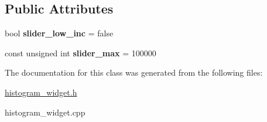 \subsection*{Public Attributes}
\begin{DoxyCompactItemize}
\item 
\hypertarget{classhistogram__widget_afc734f6bec1b2f7c8cf15dc0ed1f4511}{bool {\bfseries slider\+\_\+low\+\_\+inc} = false}\label{classhistogram__widget_afc734f6bec1b2f7c8cf15dc0ed1f4511}

\item 
\hypertarget{classhistogram__widget_a169ecaba1f71d9c88de65a37a19eca85}{const unsigned int {\bfseries slider\+\_\+max} = 100000}\label{classhistogram__widget_a169ecaba1f71d9c88de65a37a19eca85}

\end{DoxyCompactItemize}


The documentation for this class was generated from the following files\+:\begin{DoxyCompactItemize}
\item 
\hyperlink{histogram__widget_8h}{histogram\+\_\+widget.\+h}\item 
histogram\+\_\+widget.\+cpp\end{DoxyCompactItemize}
